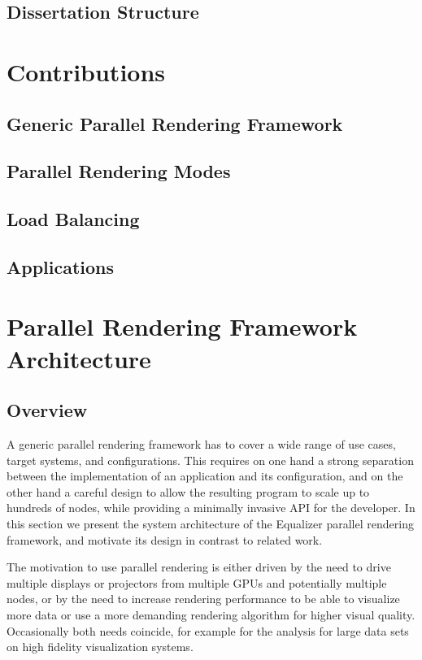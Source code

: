 \section{Dissertation Structure}


\chapter{Contributions}

\section{Generic Parallel Rendering Framework}

\section{Parallel Rendering Modes}

\section{Load Balancing}

\section{Applications}


\chapter{Parallel Rendering Framework Architecture}

\section{Overview}
A generic parallel rendering framework has to cover a wide range of use cases,
target systems, and configurations. This requires on one hand a strong
separation between the implementation of an application and its configuration,
and on the other hand a careful design to allow the resulting program to scale
up to hundreds of nodes, while providing a minimally invasive API for the
developer. In this section we present the system architecture of the Equalizer
parallel rendering framework, and motivate its design in contrast to related
work.

The motivation to use parallel rendering is either driven by the need to drive
multiple displays or projectors from multiple GPUs and potentially multiple
nodes, or by the need to increase rendering performance to be able to visualize
more data or use a more demanding rendering algorithm for higher visual quality.
Occasionally both needs coincide, for example for the analysis for large data
sets on high fidelity visualization systems.

